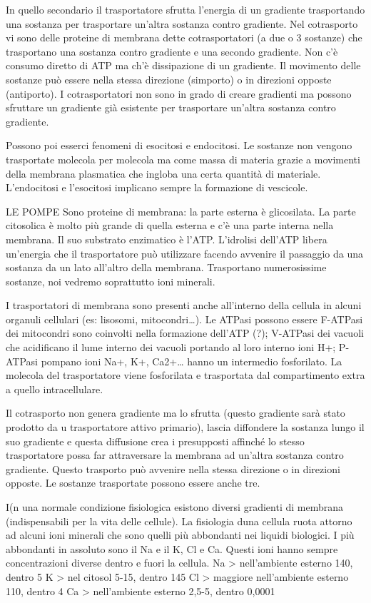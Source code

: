 \documentclass[]{article}
\begin{document}
In quello secondario il trasportatore sfrutta l'energia di un gradiente
trasportando una sostanza per trasportare un'altra sostanza contro
gradiente. Nel cotrasporto vi sono delle proteine di membrana dette
cotrasportatori (a due o 3 sostanze) che trasportano una sostanza contro
gradiente e una secondo gradiente. Non c'è consumo diretto di ATP ma
ch'è dissipazione di un gradiente. Il movimento delle sostanze può
essere nella stessa direzione (simporto) o in direzioni opposte
(antiporto). I cotrasportatori non sono in grado di creare gradienti ma
possono sfruttare un gradiente già esistente per trasportare un'altra
sostanza contro gradiente.

Possono poi esserci fenomeni di esocitosi e endocitosi. Le sostanze non
vengono trasportate molecola per molecola ma come massa di materia
grazie a movimenti della membrana plasmatica che ingloba una certa
quantità di materiale. L'endocitosi e l'esocitosi implicano sempre la
formazione di vescicole.

LE POMPE Sono proteine di membrana: la parte esterna è glicosilata. La
parte citosolica è molto più grande di quella esterna e c'è una parte
interna nella membrana. Il suo substrato enzimatico è l'ATP. L'idrolisi
dell'ATP libera un'energia che il trasportatore può utilizzare facendo
avvenire il passaggio da una sostanza da un lato all'altro della
membrana. Trasportano numerosissime sostanze, noi vedremo soprattutto
ioni minerali.

I trasportatori di membrana sono presenti anche all'interno della
cellula in alcuni organuli cellulari (es: lisosomi, mitocondri\ldots{}).
Le ATPasi possono essere F-ATPasi dei mitocondri sono coinvolti nella
formazione dell'ATP (?); V-ATPasi dei vacuoli che acidificano il lume
interno dei vacuoli portando al loro interno ioni H+; P-ATPasi pompano
ioni Na+, K+, Ca2+\ldots{} hanno un intermedio fosforilato. La molecola
del trasportatore viene fosforilata e trasportata dal compartimento
extra a quello intracellulare.

Il cotrasporto non genera gradiente ma lo sfrutta (questo gradiente sarà
stato prodotto da u trasportatore attivo primario), lascia diffondere la
sostanza lungo il suo gradiente e questa diffusione crea i presupposti
affinché lo stesso trasportatore possa far attraversare la membrana ad
un'altra sostanza contro gradiente. Questo trasporto può avvenire nella
stessa direzione o in direzioni opposte. Le sostanze trasportate possono
essere anche tre.

I(n una normale condizione fisiologica esistono diversi gradienti di
membrana (indispensabili per la vita delle cellule). La fisiologia duna
cellula ruota attorno ad alcuni ioni minerali che sono quelli più
abbondanti nei liquidi biologici. I più abbondanti in assoluto sono il
Na e il K, Cl e Ca. Questi ioni hanno sempre concentrazioni diverse
dentro e fuori la cellula. Na \textgreater{} nell'ambiente esterno 140,
dentro 5 K \textgreater{} nel citosol 5-15, dentro 145 Cl \textgreater{}
maggiore nell'ambiente esterno 110, dentro 4 Ca \textgreater{}
nell'ambiente esterno 2,5-5, dentro 0,0001
\end{document}
